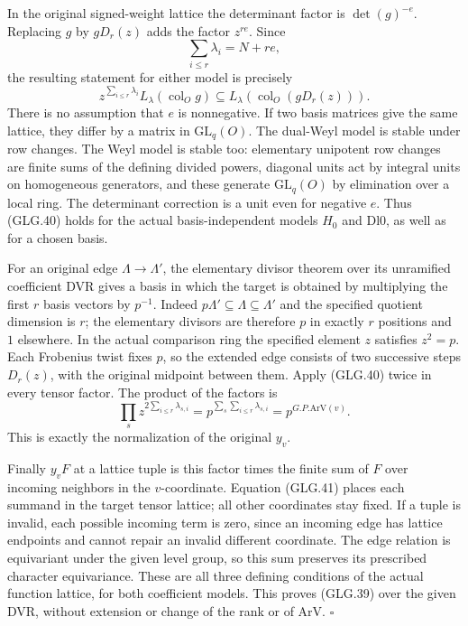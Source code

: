 \documentclass[11pt,a4paper]{article}
\numberwithin{equation}{section}
\theoremstyle{remark}\newtheorem{remark}[theorem]{Remark}
\begin{document}
In the original signed-weight lattice the determinant
factor is \(\det(g)^{-e}\). Replacing \(g\) by \(gD_r(z)\)
adds the factor \(z^{re}\). Since
\[
                 \sum_{i\le r}\lambda_i=N+re,
 \]
the resulting statement for either model is precisely
\[
 z^{\sum_{i\le r}\lambda_i}L_\lambda(\operatorname{col}_O g)
       \subseteq L_\lambda(\operatorname{col}_O(gD_r(z))).        \tag{GLG.40}
\]
There is no assumption that \(e\) is nonnegative.
If two basis matrices give the same lattice, they differ
by a matrix in \(\mathrm{GL}_q(O)\). The dual-Weyl model
is stable under row changes. The Weyl model is stable too:
elementary unipotent row changes are finite sums of the
defining divided powers, diagonal units act by integral
units on homogeneous generators, and these generate
\(\mathrm{GL}_q(O)\) by elimination over a local ring.
The determinant correction is a unit even for negative
\(e\). Thus (GLG.40) holds for the actual basis-independent
models \(H_0\) and \(\mathrm{Dl0}\), as well as for a
chosen basis.

For an original edge \(\Lambda\to\Lambda'\), the elementary
divisor theorem over its unramified coefficient DVR gives
a basis in which the target is obtained by multiplying
the first \(r\) basis vectors by \(p^{-1}\). Indeed
\(p\Lambda'\subseteq\Lambda\subseteq\Lambda'\) and the
specified quotient dimension is \(r\); the elementary
divisors are therefore \(p\) in exactly \(r\) positions
and \(1\) elsewhere. In the actual comparison ring the
specified element \(z\) satisfies \(z^2=p\). Each Frobenius
twist fixes \(p\), so the extended edge consists of two
successive steps \(D_r(z)\), with the original midpoint
between them. Apply (GLG.40) twice in every tensor factor.
The product of the factors is
\[
 \prod_s z^{2\sum_{i\le r}\lambda_{s,i}}
                         =p^{\sum_s\sum_{i\le r}\lambda_{s,i}}
                         =p^{G.P.\mathrm{ArV}(v)}.               \tag{GLG.41}
\]
This is exactly the normalization of the original \(y_v\).

Finally \(y_vF\) at a lattice tuple is this factor times
the finite sum of \(F\) over incoming neighbors in the
\(v\)-coordinate. Equation (GLG.41) places each summand
in the target tensor lattice; all other coordinates stay
fixed. If a tuple is invalid, each possible incoming
term is zero, since an incoming edge has lattice endpoints
and cannot repair an invalid different coordinate.
The edge relation is equivariant under the given level
group, so this sum preserves its prescribed character
equivariance. These are all three defining conditions of
the actual function lattice, for both coefficient models.
This proves (GLG.39) over the given DVR, without extension
or change of the rank or of \(\mathrm{ArV}\).
\hfill\(\square\)
\end{document}
